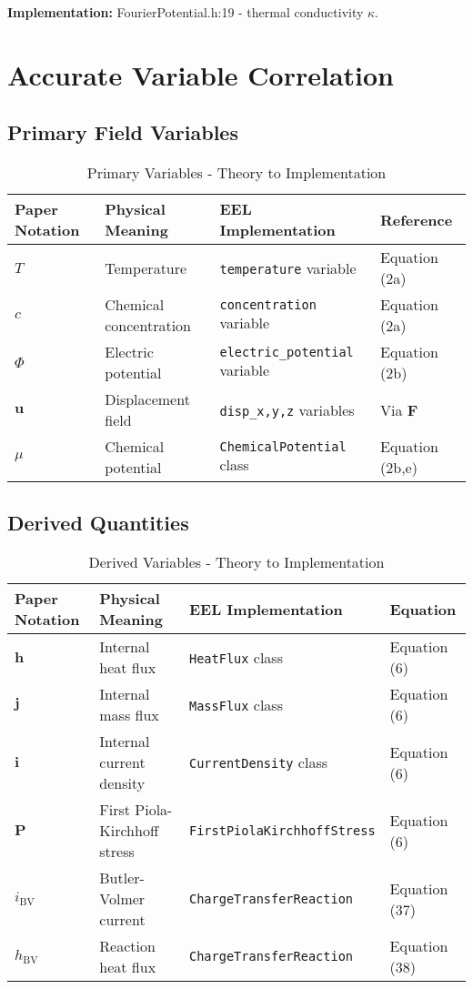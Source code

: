 \documentclass[11pt,a4paper]{article}
\begin{document}
\textbf{Implementation:} FourierPotential.h:19 - thermal conductivity $\kappa$.

\section{Accurate Variable Correlation}

\subsection{Primary Field Variables}

\begin{table}[H]
\centering
\caption{Primary Variables - Theory to Implementation}
\begin{tabular}{@{}llll@{}}
\toprule
\textbf{Paper Notation} & \textbf{Physical Meaning} & \textbf{EEL Implementation} & \textbf{Reference} \\
\midrule
$T$ & Temperature & \texttt{temperature} variable & Equation (2a) \\
$c$ & Chemical concentration & \texttt{concentration} variable & Equation (2a) \\
$\Phi$ & Electric potential & \texttt{electric\_potential} variable & Equation (2b) \\
$\mathbf{u}$ & Displacement field & \texttt{disp\_x,y,z} variables & Via $\mathbf{F}$ \\
$\mu$ & Chemical potential & \texttt{ChemicalPotential} class & Equation (2b,e) \\
\bottomrule
\end{tabular}
\end{table}

\subsection{Derived Quantities}

\begin{table}[H]
\centering
\caption{Derived Variables - Theory to Implementation}
\begin{tabular}{@{}llll@{}}
\toprule
\textbf{Paper Notation} & \textbf{Physical Meaning} & \textbf{EEL Implementation} & \textbf{Equation} \\
\midrule
$\mathbf{h}$ & Internal heat flux & \texttt{HeatFlux} class & Equation (6) \\
$\mathbf{j}$ & Internal mass flux & \texttt{MassFlux} class & Equation (6) \\
$\mathbf{i}$ & Internal current density & \texttt{CurrentDensity} class & Equation (6) \\
$\mathbf{P}$ & First Piola-Kirchhoff stress & \texttt{FirstPiolaKirchhoffStress} & Equation (6) \\
$i_{\text{BV}}$ & Butler-Volmer current & \texttt{ChargeTransferReaction} & Equation (37) \\
$h_{\text{BV}}$ & Reaction heat flux & \texttt{ChargeTransferReaction} & Equation (38) \\
\bottomrule
\end{tabular}
\end{table}
\end{document}
